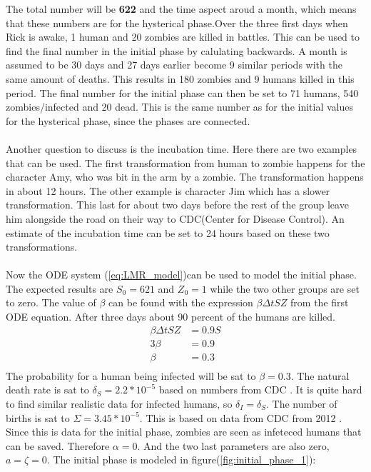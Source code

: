 \documentclass[%
twoside,                 %
final,                   %
10pt]{article}
\begin{document}
\noindent
The total number will be \textbf{622} and the time aspect aroud a month, which means that these numbers are for the hysterical phase.Over the three first days when Rick is awake, 1 human and 20 zombies are killed in battles. This can be used to find the final number in the initial phase by calulating backwards. A month is assumed to be 30 days and 27 days earlier become 9 similar periods  with the same amount of deaths. This results in 180 zombies and 9 humans killed in this period. The final number for the initial phase can then be set to 71 humans, 540 zombies/infected and 20 dead. This is the same number as for the initial values for the hysterical phase, since the phases are connected.
\\
\\
Another question to discuss is the incubation time. Here there are two examples that can be used. The first transformation from human to zombie happens for the character Amy, who was bit in the arm by a zombie. The transformation happens in about 12 hours. The other example is character Jim which has a slower transformation. This last for about two days before the rest of the group leave him alongside the road on their way to CDC(Center for Disease Control). An estimate of the incubation time can be set to 24 hours based on these two transformations.
\\
\\
Now the ODE system (\ref{eq:LMR_model})can be used to model the initial phase. The expected results are $S_0 = 621$ and $Z_0 = 1$ while the two other groups are set to zero. The value of $\beta$ can be found with the expression $\beta \Delta t S Z$ from the first ODE equation. After three days about 90 percent of the humans are killed.
\begin{equation}
	\begin{aligned}
	\beta\Delta t S Z &= 0.9 S\\
	3\beta   &= 0.9 \\
	\beta &= 0.3 \\
	\end{aligned}
\end{equation}
The probability for a human being infected will be sat to $\beta = 0.3$. The natural death rate is sat to $\delta_S = 2.2*10^{-5}$ based on numbers from CDC \cite{CBC_deaths_2011}. It is quite hard to find similar realistic data for infected humans, so $\delta_I = \delta_S$. The number of births is sat to $\Sigma = 3.45*10^{-5}$. This is based on data from CDC from 2012 \cite{CBC_births_2012}. Since this is data for the initial phase, zombies are seen as infeteced humans that can be saved. Therefore $\alpha = 0$. And the two last parameters are also zero, $a = \zeta = 0$. The initial phase is modeled in figure(\ref{fig:initial_phase_1}):
\end{document}

